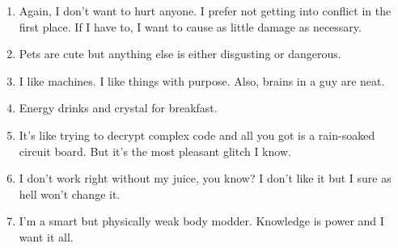 \begin{enumerate}
	\item Again, I don't want to hurt anyone. I prefer not getting into conflict in the first place. If I have to, I want to cause as little damage as necessary.
	\item Pets are cute but anything else is either disgusting or dangerous.
	\item I like machines. I like things with purpose. Also, brains in a guy are neat.
	\item Energy drinks and crystal for breakfast.
	\item It's like trying to decrypt complex code and all you got is a rain-soaked circuit board. But it's the most pleasant glitch I know.
	\item I don't work right without my juice, you know? I don't like it but I sure as hell won't change it.
	\item I'm a smart but physically weak body modder. Knowledge is power and I want it all.
\end{enumerate}

